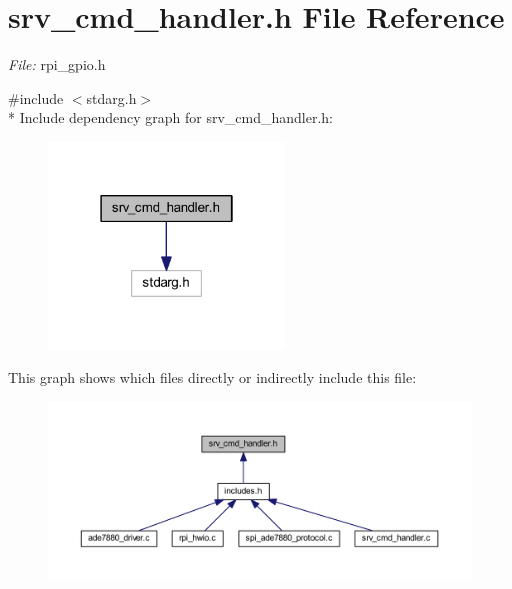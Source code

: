 \hypertarget{a00043}{\section{srv\-\_\-cmd\-\_\-handler.\-h File Reference}
\label{d6/d42/a00043}
}


{\itshape File\-:} rpi\-\_\-gpio.\-h \par
  


{\ttfamily \#include $<$stdarg.\-h$>$}\\*
Include dependency graph for srv\-\_\-cmd\-\_\-handler.\-h\-:\nopagebreak
\begin{figure}[H]
\begin{center}
\leavevmode
\includegraphics[width=178pt]{d4/d6d/a00055}
\end{center}
\end{figure}
This graph shows which files directly or indirectly include this file\-:\nopagebreak
\begin{figure}[H]
\begin{center}
\leavevmode
\includegraphics[width=350pt]{d9/d2e/a00056}
\end{center}
\end{figure}
